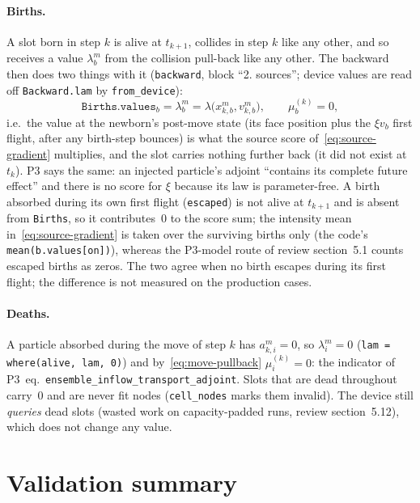 \documentclass[11pt,a4paper]{article}
\numberwithin{equation}{section}
\newcommand{\code}[1]{\texttt{#1}}
\newcommand{\pref}[1]{P3~eq.~\code{#1}}
\begin{document}
\paragraph{Births.}
A slot born in step $k$ is alive at $t_{k+1}$, collides in step $k$ like any other, and
so receives a value $\lambda^m_b$ from the collision pull-back like any other.  The
backward then does two things with it (\code{backward}, block ``2. sources''; device
values are read off \code{Backward.lam} by \code{from\_device}):
\begin{equation}
\label{eq:birth}
\code{Births.values}_b = \lambda^m_b = \lambda\big(x^m_{k,b}, v^m_{k,b}\big),
\qquad
\mu^{(k)}_b = 0 ,
\end{equation}
i.e.\ the value at the newborn's post-move state (its face position plus the
$\xi v_b$ first flight, after any birth-step bounces) is what the source score
of~\eqref{eq:source-gradient} multiplies, and the slot carries nothing further back
(it did not exist at $t_k$).  P3 says the same: an injected particle's adjoint
``contains its complete future effect'' and there is no score for $\xi$ because its
law is parameter-free.  A birth absorbed during its own first flight (\code{escaped})
is not alive at $t_{k+1}$ and is absent from \code{Births}, so it contributes~0 to the
score sum; the intensity mean in~\eqref{eq:source-gradient} is taken over the
surviving births only (the code's \code{mean(b.values[on])}), whereas the P3-model
route of review section~5.1 counts escaped births as zeros.  The two agree when no
birth escapes during its first flight; the difference is not measured on the
production cases.

\paragraph{Deaths.}
A particle absorbed during the move of step $k$ has $a^m_{k,i} = 0$, so
$\lambda^m_i = 0$ (\code{lam = where(alive, lam, 0)}) and by~\eqref{eq:move-pullback}
$\mu^{(k)}_i = 0$: the indicator of \pref{ensemble\_inflow\_transport\_adjoint}.
Slots that are dead throughout carry~0 and are never fit nodes (\code{cell\_nodes}
marks them invalid).  The device still \emph{queries} dead slots (wasted work on
capacity-padded runs, review section~5.12), which does not change any value.

\section{Validation summary}
\label{sec:validation}
\end{document}
